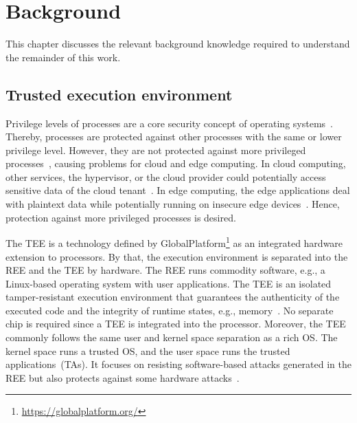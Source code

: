
\chapter{Background}\label{chapter:background}

This chapter discusses the relevant background knowledge required to understand the remainder of this work.

\section{Trusted execution environment}


Privilege levels of processes are a core security concept of operating systems~\cite{Linden1976}.
Thereby, processes are protected against other processes with the same or lower privilege level.
However, they are not protected against more privileged processes~\cite{Bratus2009}, causing problems for cloud and edge computing.
In cloud computing, other services, the hypervisor, or the cloud provider could potentially access sensitive data of the cloud tenant~\cite{Nimgaonkar2012}.
In edge computing, the edge applications deal with plaintext data while potentially running on insecure edge devices~\cite{Ning2018}.
Hence, protection against more privileged processes is desired.



The \ac{TEE} is a technology defined by GlobalPlatform\footnote{\url{https://globalplatform.org/}} as an integrated hardware extension to processors.
By that, the execution environment is separated into the \ac{REE} and the \ac{TEE} by hardware.
The \ac{REE} runs commodity software, e.g., a Linux-based operating system with user applications.
The \ac{TEE} is an isolated tamper-resistant execution environment that guarantees the authenticity of the executed code and the integrity of runtime states, e.g., memory~\cite{Sabt2015}.
No separate chip is required since a \ac{TEE} is integrated into the processor.
Moreover, the \ac{TEE} commonly follows the same user and kernel space separation as a rich OS\@.
The kernel space runs a trusted OS, and the user space runs the trusted applications~(TAs). 
It focuses on resisting software-based attacks generated in the \ac{REE} but also protects against some hardware attacks~\cite{GPSysArch}.


